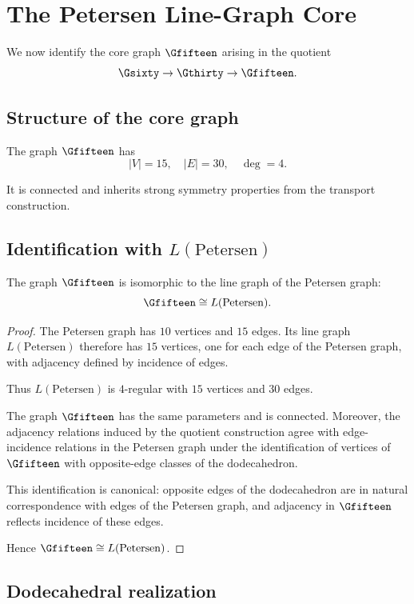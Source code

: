 \section{The Petersen Line-Graph Core}

We now identify the core graph $\Gfifteen$ arising in the quotient
\[
\Gsixty \to \Gthirty \to \Gfifteen.
\]

\subsection{Structure of the core graph}

The graph $\Gfifteen$ has
\[
|V| = 15, \quad |E| = 30, \quad \deg = 4.
\]

It is connected and inherits strong symmetry properties from the
transport construction.

\subsection{Identification with $L(\mathrm{Petersen})$}

\begin{theorem}
The graph $\Gfifteen$ is isomorphic to the line graph of the Petersen graph:
\[
\Gfifteen \cong L(\mathrm{Petersen}).
\]
\end{theorem}

\begin{proof}
The Petersen graph has $10$ vertices and $15$ edges. Its line graph
$L(\mathrm{Petersen})$ therefore has $15$ vertices, one for each edge of
the Petersen graph, with adjacency defined by incidence of edges.

Thus $L(\mathrm{Petersen})$ is $4$-regular with $15$ vertices and $30$
edges.

The graph $\Gfifteen$ has the same parameters and is connected. Moreover,
the adjacency relations induced by the quotient construction agree with
edge-incidence relations in the Petersen graph under the identification
of vertices of $\Gfifteen$ with opposite-edge classes of the dodecahedron.

This identification is canonical: opposite edges of the dodecahedron are
in natural correspondence with edges of the Petersen graph, and adjacency
in $\Gfifteen$ reflects incidence of these edges.

Hence $\Gfifteen \cong L(\mathrm{Petersen})$.
\end{proof}

\subsection{Dodecahedral realization}

